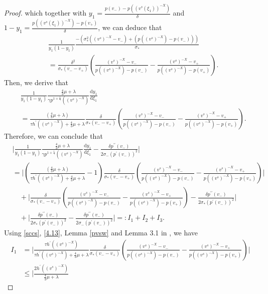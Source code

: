 \documentclass[10pt,reqno]{amsart}
\numberwithin{equation}{section}
\newcommand{\dif}{\mathrm{d}}
\begin{document}
\begin{proof}
which together with $y_1=\frac{p(v_-)-p((v^s(\xi_1))^{-X})}{\delta}$ and $1-y_1=\frac{p((v^s(\xi_1))^{-X})-p(v_+)}{\delta}$, we can deduce that
\begin{align*}
&\frac{1}{ y_1(1-y_1)}
\frac{-\left(\sigma_\ast^2((v^s)^{-X}-v_-)+\left(p((v^s)^{-X})-p(v_-)\right)\right)}{ \sigma_\ast}\\
&=\frac{\delta^2}{\sigma_\ast(v_--v_+)}\left(\frac{(v^s)^{-X}-v_-}{p((v^s)^{-X})-p(v_-)}
-\frac{(v^s)^{-X}-v_+}{p((v^s)^{-X})-p(v_+)}\right).
\end{align*}
Then, we derive that
\begin{align*}
&\frac{1}{ y_1(1-y_1)}
\frac{\frac{4}{3}\mu+\lambda}{\gamma p^{1+\frac{1}{\gamma}}((v^s)^{-X})
}\frac{\dif y_1}{\dif \xi_1}\\
&=\frac{(\frac{4}{3}\mu+\lambda)}{\tau h^\prime((v^s)^{-X})+\frac{4}{3}\mu+\lambda}
\frac{\delta}{\sigma_\ast(v_--v_+)}\left(\frac{(v^s)^{-X}-v_-}{p((v^s)^{-X})-p(v_-)}
-\frac{(v^s)^{-X}-v_+}{p((v^s)^{-X})-p(v_+)}\right).
\end{align*}
Therefore, we can conclude that
\begin{align*}
&\Big|\frac{1}{ y_1(1-y_1)}
\frac{\frac{4}{3}\mu+\lambda}{\gamma p^{1+\frac{1}{\gamma}}((v^s)^{-X})}\frac{\dif y_1}{\dif \xi_1}-\frac{\delta p^{\prime\prime}(v_-)}{2\sigma_-(p^\prime(v_-))^2}\Big|\\
&=\Big|\left(\frac{(\frac{4}{3}\mu+\lambda)}{\tau h^\prime((v^s)^{-X})+\frac{4}{3}\mu+\lambda}-1\right)
\frac{\delta}{\sigma_\ast(v_--v_+)}\left(\frac{(v^s)^{-X}-v_-}{p((v^s)^{-X})-p(v_-)}
-\frac{(v^s)^{-X}-v_+}{p((v^s)^{-X})-p(v_+)}\right)\Big|\\
&\quad+\Big|\frac{\delta}{\sigma_\ast(v_--v_+)}\left(\frac{(v^s)^{-X}-v_-}{p((v^s)^{-X})-p(v_-)}
-\frac{(v^s)^{-X}-v_+}{p((v^s)^{-X})-p(v_+)}\right)-\frac{\delta p^{\prime\prime}(v_-)}{2\sigma_\ast(p^\prime(v_-))^2}\Big|\\
&\quad+\Big|\frac{\delta p^{\prime\prime}(v_-)}{2\sigma_\ast(p^\prime(v_-))^2}-\frac{\delta p^{\prime\prime}(v_-)}{2\sigma_-(p^\prime(v_-))^2}\Big|=:I_1+I_2+I_3.
\end{align*}
Using \eqref{sccs}, \eqref{4.13}, Lemma \ref{pvsw} and Lemma 3.1 in \cite{KV3}, we have
\begin{align*}
I_1&=\Big|\frac{\tau h^\prime((v^s)^{-X})}{\tau h^\prime((v^s)^{-X})+\frac{4}{3}\mu+\lambda}
\frac{\delta}{\sigma_\ast(v_--v_+)}\left(\frac{(v^s)^{-X}-v_-}{p((v^s)^{-X})-p(v_-)}
-\frac{(v^s)^{-X}-v_+}{p((v^s)^{-X})-p(v_+)}\right)\Big|\\
&\le \Big|\frac{2h^\prime((v^s)^{-X})}{\frac{4}{3}\mu+\lambda}

\end{align*}
\end{proof}
\end{document}
